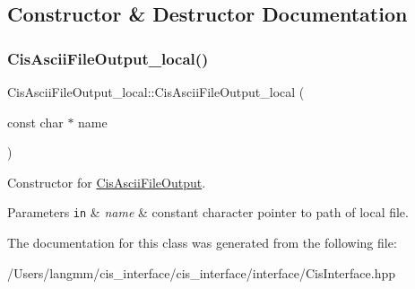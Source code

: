 \subsection{Constructor \& Destructor Documentation}
\mbox{\label{classCisAsciiFileOutput__local_a879ac5cab1e7f7b8625cef59e239db91}} 
\subsubsection{\texorpdfstring{Cis\+Ascii\+File\+Output\+\_\+local()}{CisAsciiFileOutput\_local()}}
{\footnotesize\ttfamily Cis\+Ascii\+File\+Output\+\_\+local\+::\+Cis\+Ascii\+File\+Output\+\_\+local (\begin{DoxyParamCaption}\item[{const char $\ast$}]{name }\end{DoxyParamCaption})\hspace{0.3cm}{\ttfamily [inline]}}



Constructor for \mbox{\hyperlink{classCisAsciiFileOutput}{Cis\+Ascii\+File\+Output}}. 


\begin{DoxyParams}[1]{Parameters}
\mbox{\tt in}  & {\em name} & constant character pointer to path of local file. \\
\hline
\end{DoxyParams}


The documentation for this class was generated from the following file\+:\begin{DoxyCompactItemize}
\item 
/\+Users/langmm/cis\+\_\+interface/cis\+\_\+interface/interface/Cis\+Interface.\+hpp\end{DoxyCompactItemize}
